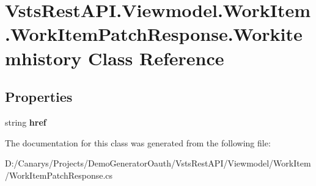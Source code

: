 \hypertarget{class_vsts_rest_a_p_i_1_1_viewmodel_1_1_work_item_1_1_work_item_patch_response_1_1_workitemhistory}{}\section{Vsts\+Rest\+A\+P\+I.\+Viewmodel.\+Work\+Item.\+Work\+Item\+Patch\+Response.\+Workitemhistory Class Reference}
\label{class_vsts_rest_a_p_i_1_1_viewmodel_1_1_work_item_1_1_work_item_patch_response_1_1_workitemhistory}
\subsection*{Properties}
\begin{DoxyCompactItemize}
\item 
\mbox{\label{class_vsts_rest_a_p_i_1_1_viewmodel_1_1_work_item_1_1_work_item_patch_response_1_1_workitemhistory_a403e4b2d1aaa161299222893bedc949c}} 
string {\bfseries href}
\end{DoxyCompactItemize}


The documentation for this class was generated from the following file\+:\begin{DoxyCompactItemize}
\item 
D\+:/\+Canarys/\+Projects/\+Demo\+Generator\+Oauth/\+Vsts\+Rest\+A\+P\+I/\+Viewmodel/\+Work\+Item/Work\+Item\+Patch\+Response.\+cs\end{DoxyCompactItemize}
